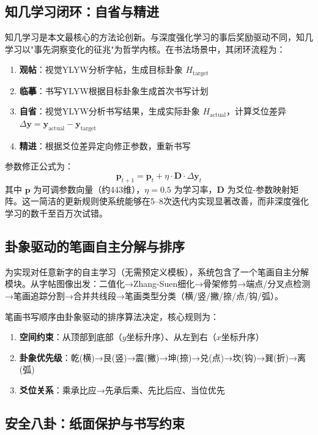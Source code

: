\documentclass[12pt,a4paper]{article}
\begin{document}
\subsection{知几学习闭环：自省与精进}

知几学习是本文最核心的方法论创新。与深度强化学习的事后奖励驱动不同，知几学习以"事先洞察变化的征兆"为哲学内核。在书法场景中，其闭环流程为：

\begin{enumerate}[nosep]
\item \textbf{观帖}：视觉YLYW分析字帖，生成目标卦象 $H_{\text{target}}$
\item \textbf{临摹}：书写YLYW根据目标卦象生成首次书写计划
\item \textbf{自省}：视觉YLYW分析书写结果，生成实际卦象 $H_{\text{actual}}$，计算爻位差异 $\Delta\mathbf{y} = \mathbf{y}_{\text{actual}} - \mathbf{y}_{\text{target}}$
\item \textbf{精进}：根据爻位差异定向修正参数，重新书写
\end{enumerate}

参数修正公式为：
\begin{equation}
\mathbf{p}_{t+1} = \mathbf{p}_t + \eta \cdot \mathbf{D} \cdot \Delta\mathbf{y}_t
\end{equation}
其中 $\mathbf{p}$ 为可调参数向量（约443维），$\eta=0.5$ 为学习率，$\mathbf{D}$ 为爻位-参数映射矩阵。这一简洁的更新规则使系统能够在5--8次迭代内实现显著改善，而非深度强化学习的数千至百万次试错。

\subsection{卦象驱动的笔画自主分解与排序}

为实现对任意新字的自主学习（无需预定义模板），系统包含了一个笔画自主分解模块。从字帖图像出发：二值化→Zhang-Suen细化→骨架修剪→端点/分叉点检测→笔画追踪分割→合并共线段→笔画类型分类（横/竖/撇/捺/点/钩/弧）。

笔画书写顺序由卦象驱动的排序算法决定，核心规则为：
\begin{enumerate}[nosep]
\item \textbf{空间约束}：从顶部到底部（$y$坐标升序）、从左到右（$x$坐标升序）
\item \textbf{卦象优先级}：乾(横)→艮(竖)→震(撇)→坤(捺)→兑(点)→坎(钩)→巽(折)→离(弧)
\item \textbf{爻位关系}：乘承比应→先承后乘、先比后应、当位优先
\end{enumerate}

\subsection{安全八卦：纸面保护与书写约束}
\end{document}
